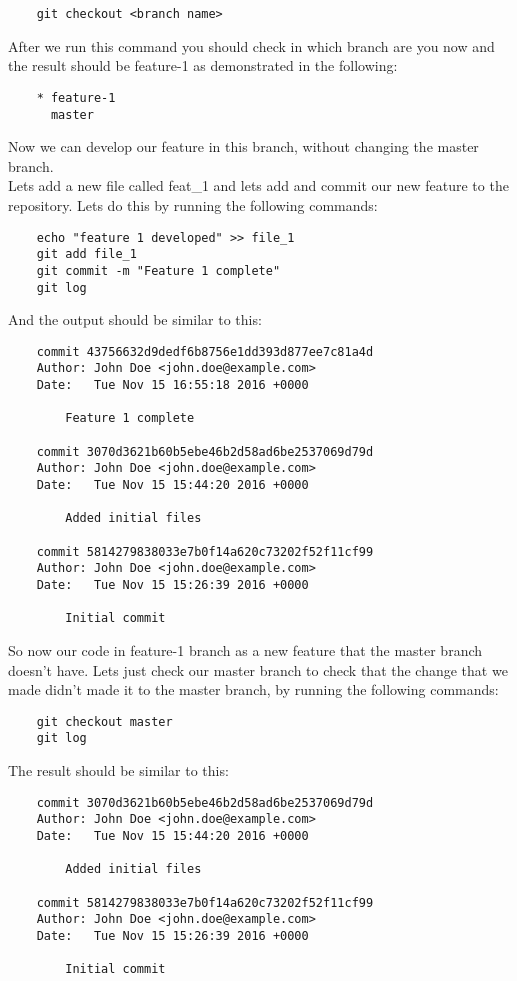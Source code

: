 \documentclass{article}
\begin{document}
\begin{lstlisting}
	git checkout <branch name>
\end{lstlisting}

After we run this command you should check in which branch are you now and the result should be feature-1 as demonstrated in the following:

\begin{lstlisting}
	* feature-1
	  master
\end{lstlisting}

Now we can develop our feature in this branch, without changing the master branch.\\
Lets add a new file called feat\_1 and lets add and commit our new feature to the repository. Lets do this by running the following commands:

\begin{lstlisting}
	echo "feature 1 developed" >> file_1
	git add file_1
	git commit -m "Feature 1 complete"
	git log
\end{lstlisting}

And the output should be similar to this:

\begin{lstlisting}
	commit 43756632d9dedf6b8756e1dd393d877ee7c81a4d
	Author: John Doe <john.doe@example.com>
	Date:   Tue Nov 15 16:55:18 2016 +0000

    	Feature 1 complete

	commit 3070d3621b60b5ebe46b2d58ad6be2537069d79d
	Author: John Doe <john.doe@example.com>
	Date:   Tue Nov 15 15:44:20 2016 +0000

    	Added initial files

	commit 5814279838033e7b0f14a620c73202f52f11cf99
	Author: John Doe <john.doe@example.com>
	Date:   Tue Nov 15 15:26:39 2016 +0000

    	Initial commit
\end{lstlisting}

So now our code in feature-1 branch as a new feature that the master branch doesn't have. Lets just check our master branch to check that the change that we made didn't made it to the master branch, by running the following commands:

\begin{lstlisting}
	git checkout master
	git log
\end{lstlisting}

The result should be similar to this:

\begin{lstlisting}
	commit 3070d3621b60b5ebe46b2d58ad6be2537069d79d
	Author: John Doe <john.doe@example.com>
	Date:   Tue Nov 15 15:44:20 2016 +0000

    	Added initial files

	commit 5814279838033e7b0f14a620c73202f52f11cf99
	Author: John Doe <john.doe@example.com>
	Date:   Tue Nov 15 15:26:39 2016 +0000

    	Initial commit
\end{lstlisting}
\end{document}
